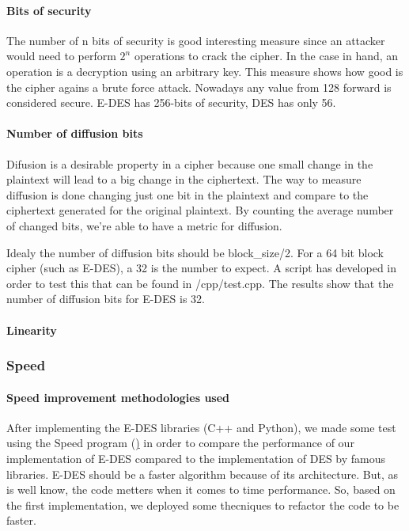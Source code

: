 \documentclass{article} %
\begin{document}
\paragraph{Bits of security}
The number of n bits of security is good interesting measure since an attacker would need to perform $2^{n}$ operations to crack the cipher. In the case in hand, an operation
is a decryption using an arbitrary key. This measure shows how good is the cipher agains a brute force attack.
Nowadays any value from 128 forward is considered secure. E-DES has 256-bits of security, DES has only 56.

\paragraph{Number of diffusion bits }
Difusion is a desirable property in a cipher because one small change in the plaintext will lead to a big change in the ciphertext. 
The way to measure diffusion is done changing just one bit in the plaintext and compare to the ciphertext generated for the original plaintext. By counting the average number
of changed bits, we're able to have a metric for diffusion. 

Idealy the number of diffusion bits should be block\_size/2. For a 64 bit block cipher (such as E-DES), a 32 is the number to expect. A script has developed in order
to test this that can be found in /cpp/test.cpp. The results show that the number of diffusion bits for E-DES is 32.

\paragraph{Linearity}


\subsubsection{Speed}
\label{speedinp}
\paragraph{Speed improvement methodologies used}

After implementing the E-DES libraries (C++ and Python), we made some test using the Speed program (\href{speed}) in order to compare the performance of our implementation
of E-DES compared to the implementation of DES by famous libraries. E-DES should be a faster algorithm because of its architecture. But, as is well know, the code metters
when it comes to time performance. So, based on the first implementation, we deployed some thecniques to refactor the code to be faster.
\end{document}
